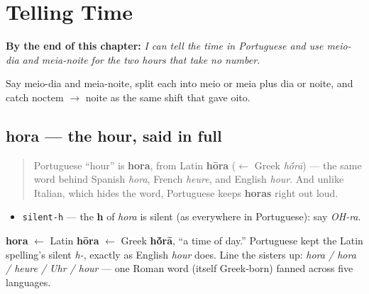 
\chapter{Telling Time}
\label{ch:pt-telling-time}

\begin{chapteropening}
\textbf{By the end of this chapter:} \emph{I can tell the time in Portuguese and use meio-dia and meia-noite for the two hours that take no number.}

Say meio-dia and meia-noite, split each into meio or meia plus dia or noite, and catch noctem $\to$ noite as the same shift that gave oito.
\end{chapteropening}

\section[hora]{hora — the hour, said in full}

\label{lesson:PT-C08-hora}



\begin{quote}
Portuguese \textquotedblleft{}hour\textquotedblright{} is \textbf{hora}, from Latin \textbf{hōra} ($\leftarrow$ Greek \emph{h\'{\={o}}rā}) — the same word behind Spanish \emph{hora}, French \emph{heure}, and English \emph{hour}. And unlike Italian, which hides the word, Portuguese keeps \textbf{horas} right out loud.
\end{quote}

\begin{sounds}
\begin{itemize}
\raggedright
  \item \texttt{silent-h} — the \textbf{h} of \emph{hora} is silent (as everywhere in Portuguese): say \emph{OH-ra}.
\end{itemize}
\end{sounds}

\begin{cousinweb}
\textbf{hora} $\leftarrow$ Latin \textbf{hōra} $\leftarrow$ Greek \textbf{h\'{\={o}}rā}, \textquotedblleft{}a time of day.\textquotedblright{} Portuguese kept the Latin spelling's silent \emph{h-}, exactly as English \emph{hour} does. Line the sisters up: \emph{hora / hora / heure / Uhr / hour} — one Roman word (itself Greek-born) fanned across five languages.
\end{cousinweb}

